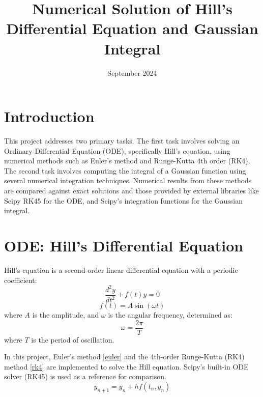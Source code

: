 \documentclass[twocolumn, 11pt]{article}
\title{Numerical Solution of Hill's Differential Equation and Gaussian Integral}
\date{September 2024}
\makeatletter
\renewcommand{\maketitle}{\bgroup
  \centering
  {\LARGE \bfseries \color{darkpurple} \@title \par}
  \vskip 1em
  {\large \color{darkpurple} \@author \par}
  \vskip 1em
  {\footnotesize \@date \color{darkpurple}\par}
  \egroup
}
\makeatother
\begin{document}
\twocolumn[
\begin{@twocolumnfalse}
    \maketitle
    \vspace{10pt}
\end{@twocolumnfalse}
]

\section*{Introduction}
This project addresses two primary tasks. The first task involves solving an Ordinary Differential Equation (ODE), specifically Hill's equation, using numerical methods such as Euler's method and Runge-Kutta 4th order (RK4). The second task involves computing the integral of a Gaussian function using several numerical integration techniques. Numerical results from these methods are compared against exact solutions and those provided by external libraries like Scipy RK45 for the ODE, and Scipy’s integration functions for the Gaussian integral.

\section{ODE: Hill's Differential Equation}
Hill's equation is a second-order linear differential equation with a periodic coefficient:
\begin{equation}
    \frac{d^2 y}{dt^2} + f(t) y = 0
\end{equation}
\begin{equation}
    f(t) = A \sin(\omega t)
\end{equation}
where \( A \) is the amplitude, and \( \omega \) is the angular frequency, determined as:
\begin{equation}
\omega = \frac{2\pi}{T}
\end{equation}
where \( T \) is the period of oscillation.

In this project, Euler's method \eqref{euler} and the 4th-order Runge-Kutta (RK4) method \eqref{rk4}  are implemented to solve the Hill equation. Scipy’s built-in ODE solver (RK45) is used as a reference for comparison.
\begin{equation}
     y_{n+1} = y_n + hf(t_n,y_n) \label{euler}  
\end{equation}
\end{document}
